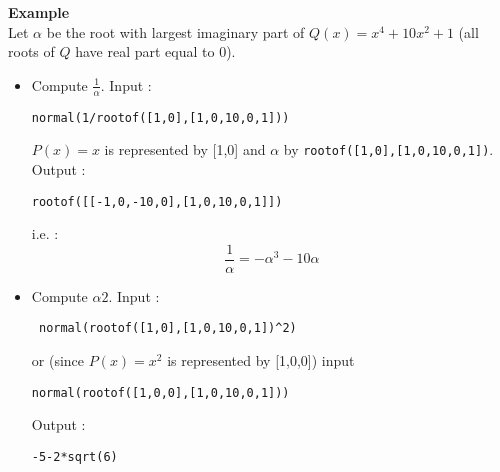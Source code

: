 \documentclass[a4paper,11pt]{book}
\begin{document}
{\bf Example}\\
Let $\alpha$ be the root with largest imaginary
part of $Q(x)=x^4+10x^2+1$ (all roots of $Q$ have real part equal to 0).
\begin{itemize}
\item Compute $\displaystyle \frac{1}{\alpha}$. Input :
\begin{center}{\tt normal(1/rootof([1,0],[1,0,10,0,1])) }\end{center}
$P(x)=x$ is represented by [1,0] and  $\alpha$
by {\tt rootof([1,0],[1,0,10,0,1])}.\\
Output :
\begin{center}{\tt rootof([[-1,0,-10,0],[1,0,10,0,1]])}\end{center}
i.e. :
\[  \frac{1}{\alpha}=-\alpha^3-10\alpha \]
\item Compute $\alpha2$. Input :
\begin{center}{\tt
    normal(rootof([1,0],[1,0,10,0,1])\verb|^|2)}\end{center}
or (since $P(x)=x^2$ is represented by [1,0,0]) input
\begin{center}{\tt normal(rootof([1,0,0],[1,0,10,0,1]))}\end{center}
Output :
\begin{center}{\tt -5-2*sqrt(6)}\end{center}
\end{itemize}
\end{document}

